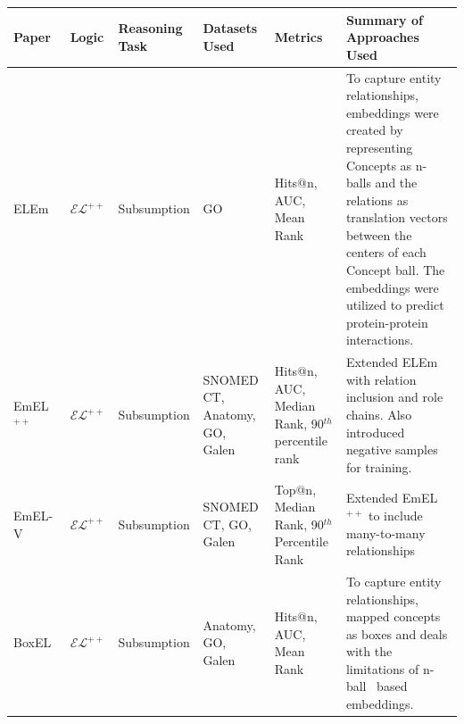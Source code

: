 {\small
\begin{longtable}{|p{2.2cm}|p{1.2cm}|p{2.4cm}|p{2.0cm}|p{2.0cm}|p{4.0cm}|}\arrayrulecolor{lightgray}
\hline
\textbf{Paper} & \textbf{Logic} & \textbf{Reasoning Task} & \textbf{Datasets Used} & \textbf{Metrics} & \textbf{Summary of Approaches Used} \\
\hline
ELEm~\cite{ELEm} & $\mathcal{EL}^{++}$ & Subsumption & GO & Hits@n, AUC, Mean Rank & To capture entity relationships, embeddings were created by representing Concepts as n-balls and the relations as translation vectors between the centers of each Concept ball. The embeddings were utilized to predict protein-protein interactions. \\
\hline
EmEL$^{++}$~\cite{Mondal} & $\mathcal{EL}^{++}$ & Subsumption & SNOMED CT, Anatomy, GO, Galen & Hits@n, AUC, Median Rank, 90$^{th}$ percentile rank &
Extended ELEm with relation inclusion and role chains. Also introduced negative samples for training.\\
\hline
EmEL-V~\cite{why_settle_for_one} & $\mathcal{EL}^{++}$ & Subsumption &SNOMED CT,  GO, Galen & Top@n, Median Rank, 90$^{th}$ Percentile Rank & Extended EmEL$^{++}$ to include many-to-many relationships \\
\hline
BoxEL~\cite{faithful_embeddings} & $\mathcal{EL}^{++}$ & Subsumption & Anatomy, GO, Galen & Hits@n, AUC, Mean Rank & To capture entity relationships, mapped concepts as boxes and deals with the limitations of n-ball~\cite{ELEm,Mondal,why_settle_for_one}
based embeddings. \\
\hline


\end{longtable}}

